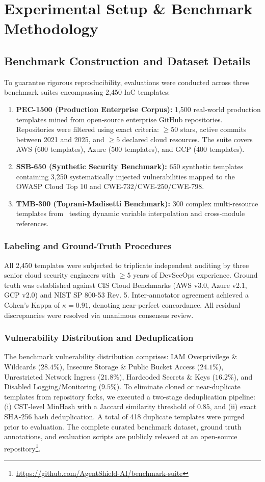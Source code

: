 \documentclass[runningheads]{llncs}
\begin{document}
\section{Experimental Setup \& Benchmark Methodology}

\subsection{Benchmark Construction and Dataset Details}
To guarantee rigorous reproducibility, evaluations were conducted across three benchmark suites encompassing 2,450 IaC templates:
\begin{enumerate}
    \item \textbf{PEC-1500 (Production Enterprise Corpus):} 1,500 real-world production templates mined from open-source enterprise GitHub repositories. Repositories were filtered using exact criteria: $\ge 50$ stars, active commits between 2021 and 2025, and $\ge 5$ declared cloud resources. The suite covers AWS (600 templates), Azure (500 templates), and GCP (400 templates).
    \item \textbf{SSB-650 (Synthetic Security Benchmark):} 650 synthetic templates containing 3,250 systematically injected vulnerabilities mapped to the OWASP Cloud Top 10 and CWE-732/CWE-250/CWE-798.
    \item \textbf{TMB-300 (Toprani-Madisetti Benchmark):} 300 complex multi-resource templates from~\cite{toprani2025automated} testing dynamic variable interpolation and cross-module references.
\end{enumerate}

\subsubsection{Labeling and Ground-Truth Procedures}
All 2,450 templates were subjected to triplicate independent auditing by three senior cloud security engineers with $\ge 5$ years of DevSecOps experience. Ground truth was established against CIS Cloud Benchmarks (AWS v3.0, Azure v2.1, GCP v2.0) and NIST SP 800-53 Rev. 5. Inter-annotator agreement achieved a Cohen's Kappa of $\kappa = 0.91$, denoting near-perfect concordance. All residual discrepancies were resolved via unanimous consensus review.

\subsubsection{Vulnerability Distribution and Deduplication}
The benchmark vulnerability distribution comprises: IAM Overprivilege \& Wildcards ($28.4\%$), Insecure Storage \& Public Bucket Access ($24.1\%$), Unrestricted Network Ingress ($21.8\%$), Hardcoded Secrets \& Keys ($16.2\%$), and Disabled Logging/Monitoring ($9.5\%$). To eliminate cloned or near-duplicate templates from repository forks, we executed a two-stage deduplication pipeline: (i) CST-level MinHash with a Jaccard similarity threshold of $0.85$, and (ii) exact SHA-256 hash deduplication. A total of 418 duplicate templates were purged prior to evaluation. The complete curated benchmark dataset, ground truth annotations, and evaluation scripts are publicly released at an open-source repository\footnote{\url{https://github.com/AgentShield-AI/benchmark-suite}}.
\end{document}
